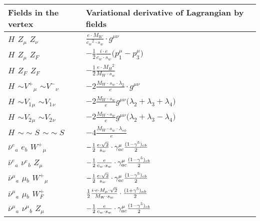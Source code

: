 \begin{center}
\begin{tabular}{|l|l|} \hline
Fields in the vertex & Variational derivative of Lagrangian by fields \\ \hline
${H}_{}$ \phantom{-} ${Z}_{\mu }$ \phantom{-} ${Z}_{\nu }$ \phantom{-}  &
	$\frac{ e \cdot M_W}{ c_w{}^2  \cdot s_w}\cdot g^{\mu \nu} $\\[2mm]
${H}_{}$ \phantom{-} ${Z}_{\mu }$ \phantom{-} $Z_F{}_{}$ \phantom{-}  &
	$-\frac{1}{2}\frac{ i \cdot e}{ c_w \cdot s_w}\big(p_1^\mu -p_3^\mu \big)$\\[2mm]
${H}_{}$ \phantom{-} $Z_F{}_{}$ \phantom{-} $Z_F{}_{}$ \phantom{-}  &
	$-\frac{1}{2}\frac{ e \cdot M_H{}^2 }{ M_W \cdot s_w}$\\[2mm]
${H}_{}$ \phantom{-} $\sim V^+{}_{\mu }$ \phantom{-} $\sim V^-{}_{\nu }$ \phantom{-}  &
	$-2\frac{ M_W \cdot s_w \cdot \lambda_2}{ e}\cdot g^{\mu \nu} $\\[2mm]
${H}_{}$ \phantom{-} $\sim V_1{}_{\mu }$ \phantom{-} $\sim V_1{}_{\nu }$ \phantom{-}  &
	$-2\frac{ M_W \cdot s_w}{ e}g^{\mu \nu} \big( \lambda_2+ \lambda_3+ \lambda_4\big)$\\[2mm]
${H}_{}$ \phantom{-} $\sim V_2{}_{\mu }$ \phantom{-} $\sim V_2{}_{\nu }$ \phantom{-}  &
	$-2\frac{ M_W \cdot s_w}{ e}g^{\mu \nu} \big( \lambda_2+ \lambda_3- \lambda_4\big)$\\[2mm]
${H}_{}$ \phantom{-} $\sim\sim S{}_{}$ \phantom{-} $\sim\sim S{}_{}$ \phantom{-}  &
	$-4\frac{ M_W \cdot s_w \cdot \lambda_{s\phi}}{ e}$\\[2mm]
$\bar{\nu}^e{}_{a }$ \phantom{-} $e{}_{b }$ \phantom{-} $W^+{}_{\mu }$ \phantom{-}  &
	$-\frac{1}{2}\frac{ e \cdot\sqrt{2}}{ s_w}\cdot \gamma_{a c}^\mu {(1-\gamma^5)_{c b}\over 2} $\\[2mm]
$\bar{\nu}^e{}_{a }$ \phantom{-} $\nu^e{}_{b }$ \phantom{-} ${Z}_{\mu }$ \phantom{-}  &
	$-\frac{1}{2}\frac{ e}{ c_w \cdot s_w}\cdot \gamma_{a c}^\mu {(1-\gamma^5)_{c b}\over 2} $\\[2mm]
$\bar{\nu}^\mu{}_{a }$ \phantom{-} $\mu{}_{b }$ \phantom{-} $W^+{}_{\mu }$ \phantom{-}  &
	$-\frac{1}{2}\frac{ e \cdot\sqrt{2}}{ s_w}\cdot \gamma_{a c}^\mu {(1-\gamma^5)_{c b}\over 2} $\\[2mm]
$\bar{\nu}^\mu{}_{a }$ \phantom{-} $\mu{}_{b }$ \phantom{-} $W^+_F{}_{}$ \phantom{-}  &
	$\frac{1}{2}\frac{ i \cdot e \cdot M_{\mu} \cdot\sqrt{2}}{ M_W \cdot s_w}\cdot {(1+\gamma^5)_{a b}\over 2} $\\[2mm]
$\bar{\nu}^\mu{}_{a }$ \phantom{-} $\nu^\mu{}_{b }$ \phantom{-} ${Z}_{\mu }$ \phantom{-}  &
	$-\frac{1}{2}\frac{ e}{ c_w \cdot s_w}\cdot \gamma_{a c}^\mu {(1-\gamma^5)_{c b}\over 2} $\\[2mm]

\end{tabular}
\end{center}
